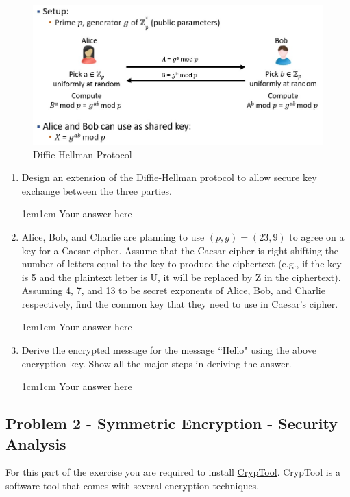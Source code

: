 \documentclass[11pt,letterpaper]{article}
\newenvironment{answer}{\em \color{blue} \begin{adjustwidth}{1cm}{1cm}}{\end{adjustwidth}}
\begin{document}
	\begin{figure}[h]
		\centering
		\includegraphics[width=0.7\columnwidth]{images/dh-protocol.jpg}
		\caption{Diffie Hellman Protocol} \label{fig:dh-protocol}
	\end{figure}
	\begin{enumerate}
		\item Design an extension of the Diffie-Hellman protocol to allow secure key exchange between the three parties.
		\begin{answer}
			Your answer here
		\end{answer}
		\item Alice, Bob, and Charlie are planning to use $(p, g) = (23, 9)$ to agree on a key for a Caesar cipher. Assume that the Caesar cipher is right shifting the number of letters equal to the key to produce the ciphertext (e.g., if the key is 5 and the plaintext letter is U, it will be replaced by Z in the ciphertext). Assuming 4, 7, and 13 to be secret exponents of Alice, Bob, and Charlie respectively, find the common key that they need to use in Caesar's cipher.
		\begin{answer}
			Your answer here
		\end{answer}
		\item Derive the encrypted message for the message ``Hello" using the above encryption key.  Show all the major steps in deriving the answer.
		\begin{answer}
			Your answer here
		\end{answer}
	\end{enumerate}
	
	\newpage 
	
	\subsection*{Problem 2 - Symmetric Encryption - Security Analysis}
	For this part of the exercise you are required to install \href{https://www.cryptool.org/en/ct1/}{CrypTool}. CrypTool is a software tool that comes with several encryption techniques.  
	
\end{document}
